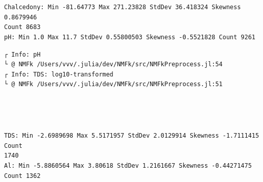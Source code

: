 \documentclass[11pt]{article}
\begin{document}
    \begin{center}
    \end{center}
    { \hspace*{\fill} \\}
    
    \begin{center}
    \end{center}
    { \hspace*{\fill} \\}
    
    \begin{Verbatim}[commandchars=\\\{\}]
Chalcedony: Min -81.64773 Max 271.23828 StdDev 36.418324 Skewness 0.8679946
Count 8683
pH: Min 1.0 Max 11.7 StdDev 0.55800503 Skewness -0.5521828 Count 9261
    \end{Verbatim}

    \begin{Verbatim}[commandchars=\\\{\}]
┌ Info: pH
└ @ NMFk /Users/vvv/.julia/dev/NMFk/src/NMFkPreprocess.jl:54
┌ Info: TDS: log10-transformed
└ @ NMFk /Users/vvv/.julia/dev/NMFk/src/NMFkPreprocess.jl:51
    \end{Verbatim}

    \begin{center}
    \end{center}
    { \hspace*{\fill} \\}
    
    \begin{center}
    \end{center}
    { \hspace*{\fill} \\}
    
    \begin{Verbatim}[commandchars=\\\{\}]
TDS: Min -2.6989698 Max 5.5171957 StdDev 2.0129914 Skewness -1.7111415 Count
1740
Al: Min -5.8860564 Max 3.80618 StdDev 1.2161667 Skewness -0.44271475 Count 1362
    \end{Verbatim}
\end{document}

